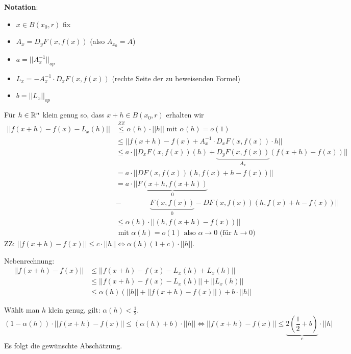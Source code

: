 \documentclass[main.tex]{subfiles}
\begin{document}
\begin{Beweis}[Gleichheit für $d = 1$]
  \textbf{Notation}:
  \begin{itemize}
    \item $x \in B(x_0,r)$ fix
    \item $A_x = D_y F(x,f(x))$ (also $A_{x_0} = A$)
    \item $a = ||A_x^{-1}||_{op}$
    \item $L_x = -A_x^{-1} \cdot D_x F(x,f(x))$ (rechte Seite der zu beweisenden Formel)
    \item $b = ||L_x||_{op}$
  \end{itemize}
  Für $h \in \mathbb{R}^n$ klein genug so, dass $x + h \in B(x_0,r)$ erhalten wir
  $$\begin{aligned}
    ||f(x+h) - f(x) - L_x(h)|| & \stackrel{\scriptscriptstyle ZZ}{\leq} \alpha(h) \cdot ||h|| \text{ mit } \alpha(h) = o(1) \\
    & \leq ||f(x+h) - f(x) + A_x^{-1}\cdot D_x F(x,f(x)) \cdot h|| \\
    & \leq a \cdot ||D_x F(x,f(x))(h) + \underbrace{D_y F(x,f(x))}_{A_x}(f(x+h) -f(x))|| \\
    & = a \cdot ||DF(x,f(x))(h,f(x)+h - f(x))|| \\
    & = a \cdot ||\underbrace{F(x+h,f(x+h))}_{0} \\
    & - \qquad \qquad \underbrace{F(x,f(x))}_{0} - DF(x,f(x))(h,f(x)+h - f(x))|| \\
    & \leq \alpha(h) \cdot ||(h,f(x+h)-f(x))|| \\
    & \text{ mit } \alpha(h) = o(1) \text{ also } \alpha \to 0 \text{ (für } h \to 0)
  \end{aligned}$$
  ZZ: $||f(x+h) - f(x)|| \leq c \cdot ||h|| \Leftrightarrow \alpha(h)(1+c) \cdot ||h||$.

  Nebenrechnung:
  $$\begin{aligned}
    ||f(x + h) - f(x)|| & \leq ||f(x+h) - f(x) -L_x(h) + L_x(h)|| \\
    & \leq ||f(x+h) - f(x) -L_x(h)|| + ||L_x(h)|| \\
    & \leq \alpha(h)(||h|| + ||f(x+h)-f(x)||) + b \cdot ||h||
  \end{aligned}$$

  Wählt man $h$ klein genug, gilt: $\alpha(h) < \frac{1}{2}$.
  $$(1 - \alpha(h)) \cdot ||f(x+h) - f(x)|| \leq (\alpha(h) + b) \cdot ||h|| \Leftrightarrow ||f(x + h) - f(x)|| \leq \underbrace{2 \left(\dfrac{1}{2} + b\right)}_{c} \cdot ||h|$$
  Es folgt die gewünschte Abschätzung.
\end{Beweis}
\end{document}
